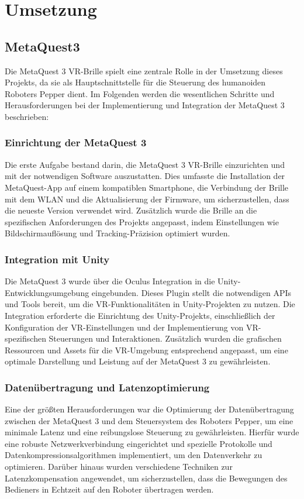 \chapter{Umsetzung}
\section{MetaQuest3}
Die MetaQuest 3 VR-Brille spielt eine zentrale Rolle in der Umsetzung dieses Projekts, da sie als Hauptschnittstelle für die Steuerung des humanoiden Roboters Pepper dient. Im Folgenden werden die wesentlichen Schritte und Herausforderungen bei der Implementierung und Integration der MetaQuest 3 beschrieben:

\subsection{Einrichtung der MetaQuest 3}
Die erste Aufgabe bestand darin, die MetaQuest 3 VR-Brille einzurichten und mit der notwendigen Software auszustatten. Dies umfasste die Installation der MetaQuest-App auf einem kompatiblen Smartphone, die Verbindung der Brille mit dem WLAN und die Aktualisierung der Firmware, um sicherzustellen, dass die neueste Version verwendet wird. Zusätzlich wurde die Brille an die spezifischen Anforderungen des Projekts angepasst, indem Einstellungen wie Bildschirmauflösung und Tracking-Präzision optimiert wurden.

\subsection{Integration mit Unity}
Die MetaQuest 3 wurde über die Oculus Integration in die Unity-Entwicklungsumgebung eingebunden. Dieses Plugin stellt die notwendigen APIs und Tools bereit, um die VR-Funktionalitäten in Unity-Projekten zu nutzen. Die Integration erforderte die Einrichtung des Unity-Projekts, einschließlich der Konfiguration der VR-Einstellungen und der Implementierung von VR-spezifischen Steuerungen und Interaktionen. Zusätzlich wurden die grafischen Ressourcen und Assets für die VR-Umgebung entsprechend angepasst, um eine optimale Darstellung und Leistung auf der MetaQuest 3 zu gewährleisten.

\subsection{Datenübertragung und Latenzoptimierung}
Eine der größten Herausforderungen war die Optimierung der Datenübertragung zwischen der MetaQuest 3 und dem Steuersystem des Roboters Pepper, um eine minimale Latenz und eine reibungslose Steuerung zu gewährleisten. Hierfür wurde eine robuste Netzwerkverbindung eingerichtet und spezielle Protokolle und Datenkompressionsalgorithmen implementiert, um den Datenverkehr zu optimieren. Darüber hinaus wurden verschiedene Techniken zur Latenzkompensation angewendet, um sicherzustellen, dass die Bewegungen des Bedieners in Echtzeit auf den Roboter übertragen werden.

